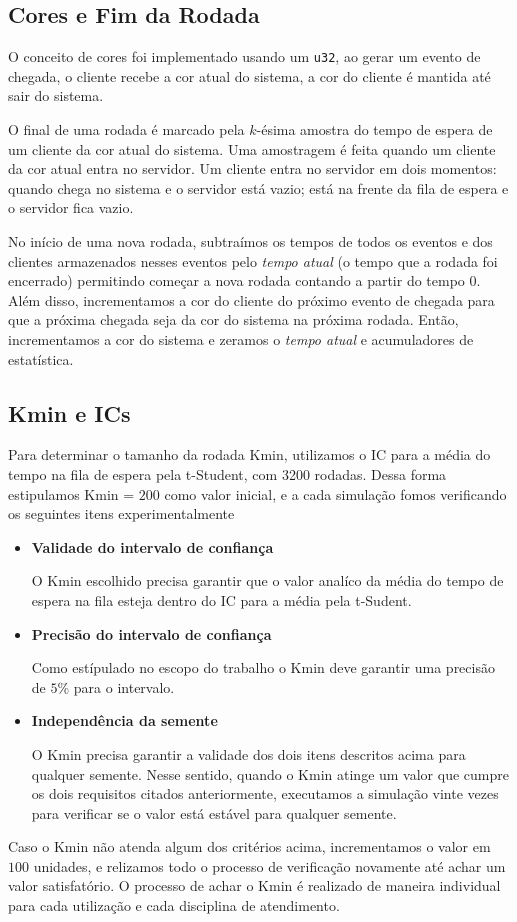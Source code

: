 \documentclass[a4paper]{article}
\newcommand{\inlcode}{\texttt}
\begin{document}
\subsection{Cores e Fim da Rodada}
O conceito de cores foi implementado usando um \inlcode{u32},
ao gerar um evento de chegada,
o cliente recebe a cor atual do sistema,
a cor do cliente é mantida até sair do sistema.

O final de uma rodada é marcado pela \(k\)-ésima
amostra do tempo de espera de
um cliente da cor atual do sistema.
Uma amostragem é feita quando um cliente da cor atual
entra no servidor.
Um cliente entra no servidor em dois momentos:
quando chega no sistema e o servidor está vazio;
está na frente da fila de espera e o servidor fica vazio.

No início de uma nova rodada,
subtraímos os tempos de todos os eventos e
dos clientes armazenados nesses eventos
pelo \emph{tempo atual} (o tempo que a rodada foi encerrado)
permitindo começar a nova rodada contando a partir do tempo \(0\).
Além disso, incrementamos a cor do cliente
do próximo evento de chegada
para que a próxima chegada seja da cor do sistema na próxima rodada.
Então, incrementamos a cor do sistema e
zeramos o \emph{tempo atual} e
acumuladores de estatística.

\subsection{Kmin e ICs}
Para determinar o tamanho da rodada Kmin, utilizamos o IC para a
média do tempo na fila de espera pela t-Student, com 3200 rodadas.
Dessa forma estipulamos Kmin = \(200\) como valor inicial, e a cada simulação
fomos verificando os seguintes itens experimentalmente
\begin{itemize}
    \item \textbf{Validade do intervalo de confiança} \par
        O Kmin escolhido precisa garantir que o valor
        analíco da média do tempo de espera na fila esteja dentro do
        IC para a média pela t-Sudent.

    \item \textbf{Precisão do intervalo de confiança} \par
        Como estípulado no escopo do trabalho o Kmin deve garantir
        uma precisão de \(5\%\) para o intervalo.

    \item \textbf{Independência da semente} \par
        O Kmin precisa garantir a validade dos dois itens
        descritos acima para qualquer semente. Nesse sentido,
        quando o Kmin atinge um valor que cumpre os dois
        requisitos citados anteriormente, executamos a simulação
        vinte vezes para verificar se o valor está estável para
        qualquer semente.
\end{itemize}
Caso o Kmin não atenda algum dos critérios acima, incrementamos o
valor em \(100\) unidades, e relizamos todo o processo de verificação
novamente até achar um valor satisfatório. O processo de achar o Kmin
é realizado de maneira individual para cada utilização e cada disciplina
de atendimento.
\end{document}
